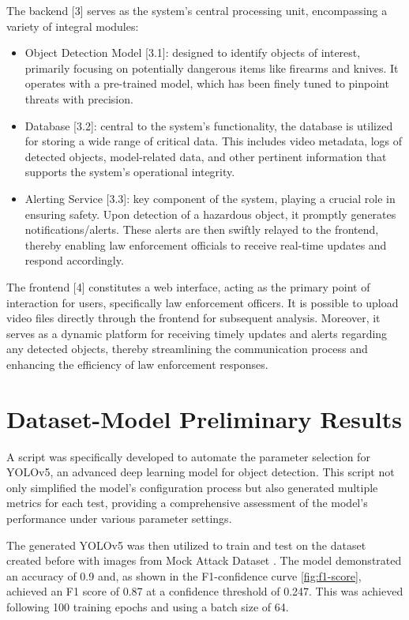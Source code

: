 The backend [3] serves as the system's central processing unit, encompassing a variety of integral modules:
\begin{itemize}
    \item Object Detection Model [3.1]: designed to identify objects of interest, primarily focusing on potentially dangerous items like firearms and knives. It operates with a pre-trained model, which has been finely tuned to pinpoint threats with precision.
    \item Database [3.2]: central to the system's functionality, the database is utilized for storing a wide range of critical data. This includes video metadata, logs of detected objects, model-related data, and other pertinent information that supports the system's operational integrity.
    \item Alerting Service [3.3]: key component of the system, playing a crucial role in ensuring safety. Upon detection of a hazardous object, it promptly generates notifications/alerts. These alerts are then swiftly relayed to the frontend, thereby enabling law enforcement officials to receive real-time updates and respond accordingly.
\end{itemize}

The frontend [4] constitutes a web interface, acting as the primary point of interaction for users, specifically law enforcement officers. It is possible to upload video files directly through the frontend for subsequent analysis. Moreover, it serves as a dynamic platform for receiving timely updates and alerts regarding any detected objects, thereby streamlining the communication process and enhancing the efficiency of law enforcement responses.

\section{Dataset-Model Preliminary Results}
A script was specifically developed to automate the parameter selection for YOLOv5, an advanced deep learning model for object detection. This script not only simplified the model's configuration process but also generated multiple metrics for each test, providing a comprehensive assessment of the model's performance under various parameter settings.

The generated YOLOv5 was then utilized to train and test on the dataset created before with images from Mock Attack Dataset \cite{rfc45}. The model demonstrated an accuracy of 0.9 and, as shown in the F1-confidence curve \ref{fig:f1-score}, achieved an F1 score of 0.87 at a confidence threshold of 0.247. This was achieved following 100 training epochs and using a batch size of 64.

